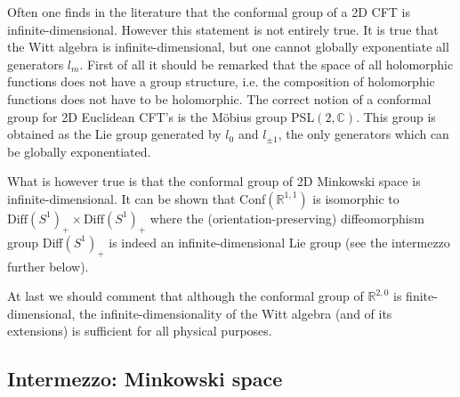 
	\begin{remark}
		Often one finds in the literature that the conformal group of a 2D CFT is infinite-dimensional. However this statement is not entirely true. It is true that the Witt algebra is infinite-dimensional, but one cannot globally exponentiate all generators $l_m$. First of all it should be remarked that the space of all holomorphic functions does not have a group structure, i.e. the composition of holomorphic functions does not have to be holomorphic. The correct notion of a conformal group for 2D Euclidean CFT's is the M\"obius group PSL$(2, \mathbb{C})$. This group is obtained as the Lie group generated by $l_0$ and $l_{\pm1}$, the only generators which can be globally exponentiated.

		What is however true is that the conformal group of 2D Minkowski space is infinite-dimensional. It can be shown that Conf$(\mathbb{R}^{1, 1})$ is isomorphic to $\text{Diff}(S^1)_+\times\text{Diff}(S^1)_+$ where the (orientation-preserving) diffeomorphism group Diff$(S^1)_+$ is indeed an infinite-dimensional Lie group (see the intermezzo further below).

		At last we should comment that although the conformal group of $\mathbb{R}^{2, 0}$ is finite-dimensional, the infinite-dimensionality of the Witt algebra (and of its extensions) is sufficient for all physical purposes.
	\end{remark}


\subsection{Intermezzo: Minkowski space}

